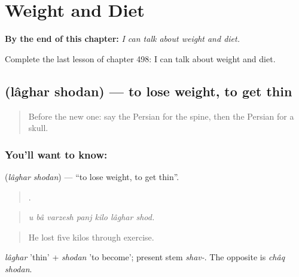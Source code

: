 
\chapter{Weight and Diet}
\label{ch:fa-weight-and-diet}

\begin{chapteropening}
\textbf{By the end of this chapter:} \emph{I can talk about weight and diet.}

Complete the last lesson of chapter 498: I can talk about weight and diet.
\end{chapteropening}

\section[\texorpdfstring{\fa{لاغر} \fa{شدن} (lâghar shodan)}{لاغر شدن (lâghar shodan)}]{  (lâghar shodan) — to lose weight, to get thin}

\label{lesson:FA-C498-laghar-shodan}



\begin{quote}
Before the new one: say the Persian for the spine, then the Persian for a skull.
\end{quote}

\subsection*{You'll want to know:  }
\textbf{ } (\emph{lâghar shodan}) — \textquotedblleft{}to lose weight, to get thin\textquotedblright{}.

\begin{quote}
      .
\end{quote}

\begin{quote}
\emph{u bâ varzesh panj kilo lâghar shod.}
\end{quote}

\begin{quote}
He lost five kilos through exercise.
\end{quote}

\emph{lâghar} 'thin' + \emph{shodan} 'to become'; present stem \emph{shav-}. The opposite is \emph{châq shodan}.

